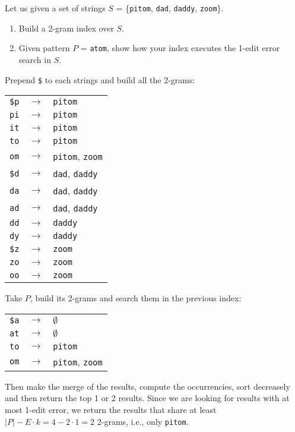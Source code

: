 \exercise

Let us given a set of strings $S$ = \{\texttt{pitom}, \texttt{dad},
\texttt{daddy}, \texttt{zoom}\}.

\begin{enumerate}

  \item Build a 2-gram index over $S$.

  \item Given pattern $P$ = \texttt{atom}, show how your index executes the
  1-edit error search in $S$.

\end{enumerate}

\solution

Prepend \texttt{\$} to each strings and build all the 2-grams:
%
\begin{longtable}{ccl}
  \texttt{\$p} & $\rightarrow$ & \texttt{pitom}\\
  \texttt{pi} & $\rightarrow$ & \texttt{pitom} \\
  \texttt{it} & $\rightarrow$ & \texttt{pitom} \\
  \texttt{to} & $\rightarrow$ & \texttt{pitom} \\
  \texttt{om} & $\rightarrow$ & \texttt{pitom}, \texttt{zoom} \\
  \texttt{\$d} & $\rightarrow$ & \texttt{dad}, \texttt{daddy} \\
  \texttt{da} & $\rightarrow$ & \texttt{dad}, \texttt{daddy} \\
  \texttt{ad} & $\rightarrow$ & \texttt{dad}, \texttt{daddy} \\
  \texttt{dd} & $\rightarrow$ & \texttt{daddy} \\
  \texttt{dy} & $\rightarrow$ & \texttt{daddy} \\
  \texttt{\$z} & $\rightarrow$ & \texttt{zoom} \\
  \texttt{zo} & $\rightarrow$ & \texttt{zoom} \\
  \texttt{oo} & $\rightarrow$ & \texttt{zoom} \\
\end{longtable}
%
Take $P$, build its 2-grams and search them in the previous index:
%
\begin{longtable}{ccl}
  \texttt{\$a} & $\rightarrow$ & $\emptyset$\\
  \texttt{at} & $\rightarrow$ & $\emptyset$ \\
  \texttt{to} & $\rightarrow$ & \texttt{pitom} \\
  \texttt{om} & $\rightarrow$ & \texttt{pitom}, \texttt{zoom} \\
\end{longtable}
%
Then make the merge of the results, compute the occurrencies, sort decreasely
and then return the top 1 or 2 results. Since we are looking for results with at
most 1-edit error, we return the results that share at least $|P| - E \cdot k
= 4 - 2 \cdot 1 = 2$ 2-grams, i.e., only \texttt{pitom}.

